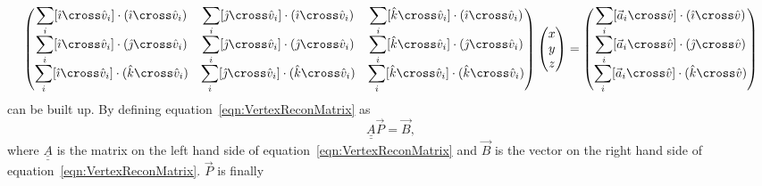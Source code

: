 \begin{equation}
  \begin{pmatrix}
    \displaystyle\sum_i [\hat{\imath} \cross \hat{v}_i] \cdot (\hat{\imath} \cross \hat{v}_i) & \displaystyle\sum_i [\hat{\jmath} \cross \hat{v}_i] \cdot (\hat{\imath} \cross \hat{v}_i) & \displaystyle\sum_i [\hat{k} \cross \hat{v}_i] \cdot (\hat{\imath} \cross \hat{v}_i) \\
    \displaystyle\sum_i [\hat{\imath} \cross \hat{v}_i] \cdot (\hat{\jmath} \cross \hat{v}_i) & \displaystyle\sum_i [\hat{\jmath} \cross \hat{v}_i] \cdot (\hat{\jmath} \cross \hat{v}_i) & \displaystyle\sum_i [\hat{k} \cross \hat{v}_i] \cdot (\hat{\jmath} \cross \hat{v}_i) \\ 
    \displaystyle\sum_i [\hat{\imath} \cross \hat{v}_i] \cdot (\hat{k} \cross \hat{v}_i) & \displaystyle\sum_i [\hat{\jmath} \cross \hat{v}_i] \cdot (\hat{k} \cross \hat{v}_i) & \displaystyle\sum_i [\hat{k} \cross \hat{v}_i] \cdot (\hat{k} \cross \hat{v}_i) 
  \end{pmatrix}
  \begin{pmatrix}
   x \\
   y \\
   z
  \end{pmatrix}
  =
  \begin{pmatrix}
    \displaystyle\sum_i [\vec{a}_i \cross \hat{v}] \cdot (\hat{\imath} \cross \hat{v}) \\
    \displaystyle\sum_i [\vec{a}_i \cross \hat{v}] \cdot (\hat{\jmath} \cross \hat{v}) \\
    \displaystyle\sum_i [\vec{a}_i \cross \hat{v}] \cdot (\hat{k} \cross \hat{v})
  \end{pmatrix}
  \label{eqn:VertexReconMatrix}
\end{equation}
can be built up.  By defining equation~\ref{eqn:VertexReconMatrix} as
\begin{equation}
  \underline{\underline{A}} \vec{P} = \vec{B},
  \label{eqn:VertexReconMatrixSimple}
\end{equation}
where $\underline{\underline{A}}$ is the matrix on the left hand side of equation~\ref{eqn:VertexReconMatrix} and $\vec{B}$ is the vector on the right hand side of equation~\ref{eqn:VertexReconMatrix}.  $\vec{P}$ is finally
